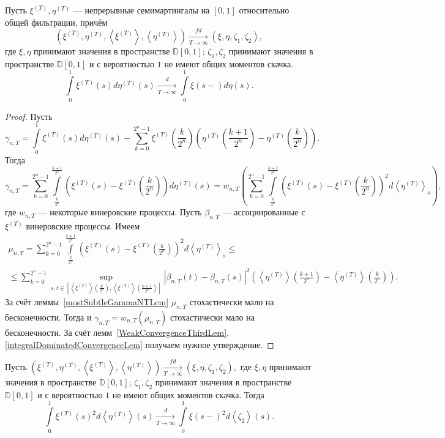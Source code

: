\documentclass[12pt, a4paper, titlepage]{article}
\begin{document}
 \begin{theorem}\label{firstMainTheorem}
  Пусть $\xi^{(T)}, \eta^{(T)}$ --- 
  непрерывные семимартингалы на $[0,1]$ относительно общей фильтрации, причём
  $$\left(\xi^{(T)}, \eta^{(T)}, \left<\xi^{(T)}\right>,\left<\eta^{(T)}\right>\right)
  \xrightarrow[T\to\infty]{fd} \left(\xi, \eta, \zeta_1, \zeta_2\right),$$
  где $\xi, \eta$ принимают значения в пространстве $\mathbb{D}[0,1]$;
  $\zeta_1, \zeta_2$ принимают значения в пространстве $\mathbb{D}[0,1]$
  и с вероятностью $1$ не имеют общих моментов скачка.
$$\int\limits_0^1 \xi^{(T)}(s)d\eta^{(T)}(s)
\xrightarrow[T \to \infty]{d} \int\limits_0^1 \xi(s-)d\eta(s).$$
 \end{theorem}
 \begin{proof}
  Пусть
$$\gamma_{n, T}=
 \int\limits_0^1 \xi^{(T)}(s)d\eta^{(T)}(s)-
 \sum\limits_{k=0}^{2^n-1}\xi^{(T)}\left(\frac{k}{2^n}\right)\left(\eta^{(T)}
 \left(\frac{k+1}{2^n}\right)-\eta^{(T)}\left(\frac{k}{2^n}\right)\right).$$
Тогда
$$\gamma_{n, T}=
 \sum\limits_{k=0}^{2^n-1}
 \int\limits_{\frac{k}{2^n}}^{\frac{k+1}{2^n}}
 \left(\xi^{(T)}(s)-\xi^{(T)}\left(\frac{k}{2^n}\right)\right)d\eta^{(T)}(s)=
 w_{n,T}\left(\sum\limits_{k=0}^{2^n-1}
 \int\limits_{\frac{k}{2^n}}^{\frac{k+1}{2^n}}
 \left(\xi^{(T)}(s)-\xi^{(T)}\left(\frac{k}{2^n}\right)\right)^2d\left<\eta^{(T)}\right>_s\right),
$$
где $w_{n,T}$ --- некоторые винеровские процессы. 
Пусть $\beta_{n,T}$ --- ассоциированные с $\xi^{(T)}$ винеровские процессы. Имеем
  \begin{multline*}\mu_{n, T}=
\sum\limits_{k=0}^{2^n-1}
 \int\limits_{\frac{k}{2^n}}^{\frac{k+1}{2^n}}
 \left(\xi^{(T)}(s)-\xi^{(T)}\left(\frac{k}{2^n}\right)\right)^2d\left<\eta^{(T)}\right>_s \le \\ \le
\sum\limits_{k=0}^{2^n-1}
 \sup\limits_{s, t \in [\left<\xi^{(T)}\right>(\frac{k}{2^n}), \left<\xi^{(T)}\right>(\frac{k+1}{2^n})]}
  \left|\beta_{n,T}(t)-\beta_{n,T}(s)\right|^2
 \left(\left<\eta^{(T)}\right>\left(\frac{k+1}{2^n}\right)-\left<\eta^{(T)}\right>\left(\frac{k}{2^n}\right)
 \right).
 \end{multline*}
 За счёт леммы~\ref{mostSubtleGammaNTLem} $\mu_{n,T}$ стохастически мало на бесконечности.
 Тогда и $\gamma_{n, T}=w_{n, T}(\mu_{n,T})$ стохастически мало на бесконечности. 
 За счёт лемм~\ref{WeakConvergenceThirdLem}, \ref{integralDominatedConvergenceLem} 
 получаем нужное утверждение. 
 \end{proof}
 
\begin{theorem}\label{secondMainTheorem}
  Пусть 
  $(\xi^{(T)}, \eta^{(T)}, \left<\xi^{(T)}\right>,\left<\eta^{(T)}\right>)
  \xrightarrow[T\to\infty]{fd} (\xi, \eta, \zeta_1, \zeta_2),$
  где $\xi, \eta$ принимают значения в пространстве $\mathbb{D}[0,1]$;
  $\zeta_1, \zeta_2$ принимают значения в пространстве $\mathbb{D}[0,1]$
  и с вероятностью $1$ не имеют общих моментов скачка. Тогда
$$\int\limits_0^1 \xi^{(T)}(s)^2d\left<\eta^{(T)}\right>(s)
\xrightarrow[T \to \infty]{d} \int\limits_0^1 \xi(s-)^2d\left<\zeta_2\right>(s).$$
\end{theorem}
\end{document}
